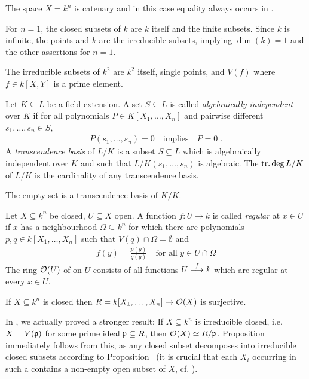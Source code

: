\documentclass[a4paper,parskip=half,numbers=enddot, DIV=12, headheight=30pt]{scrreprt}
\begin{document}
\begin{thm}
	The space $X=k^n$ is catenary and in this case equality always occurs in .
\end{thm}
\begin{example}
	For $n=1$, the closed subsets of $k$ are $k$ itself and the finite subsets. Since $k$ is infinite, the points and $k$ are the irreducible subsets, implying $\dim(k) = 1 $ and the other assertions for $n=1$.
\end{example}
\begin{example}
	The irreducible subsets of $k^2$ are $k^2$ itself, single points, and $V(f)$ where $f\in k[X,Y]$ is a prime element.
\end{example}
\begin{defi}
	Let $K\subseteq L$ be a field extension. A set $S\subseteq L$ is called \emph{algebraically independent} over $K$ if for all polynomials $P\in K[X_1,\ldots,X_n]$ and pairwise different $s_1,\ldots, s_n\in S$, 
	\begin{align*}
	P(s_1,\ldots, s_n) =0\quad\text{implies}\quad P=0\;. 
	\end{align*}
	A \emph{transcendence basis} of $L/K$ is a subset $S\subseteq L$ which is algebraically independent over $K$ and such that $L/K(s_1,\ldots,s_n)$ is algebraic. The  $\operatorname{tr.deg} L/K$ of $L/K$ is the cardinality of any transcendence basis.
\end{defi}
\begin{example*}
	The empty set is a transcendence basis of $K/K$. 
\end{example*}
\begin{defi} 
	Let $X\subseteq k^n$ be closed, $U\subseteq X$ open. A function $f\colon U\to k$ is called \emph{regular} at $x\in U$ if $x$ has a neighbourhood $\Omega\subseteq k^n$ for which there are polynomials $p,q\in k[X_1,\ldots,X_n]$ such that $V(q)\cap \Omega=\emptyset$ and 
	\begin{align*}
	f(y) = \frac{p(y)}{q(y)}\quad\text{for all }y\in U\cap \Omega
	\end{align*}
	The ring $\mathcal{O}(U)$ of  on $U$ consists of all functions $U\morphism[f] k$ which are regular at every $x\in U$.
\end{defi}
\begin{prop}
	If $X\subseteq k^n$ is closed then $R= k[X_1,\ldots, X_n] \to \mathcal{O}(X)$ is surjective.
\end{prop}
In \cite[Proposition~2.2.2]{alg1}, we actually proved a stronger result: If $X\subseteq k^n$ is irreducible closed, i.e.\ $X=V(\mathfrak{p})$ for some prime ideal $\mathfrak{p}\subseteq R$, then $\mathcal{O}(X)\simeq R/\mathfrak{p}$. Proposition~ immediately follows from this, as any closed subset decomposes into irreducible closed subsets according to Proposition~ (it is crucial that each $X_i$ occurring in such a contains a non-empty open subset of $X$, cf. \cite[Proposition~2.1.1]{alg1}).
\end{document}

